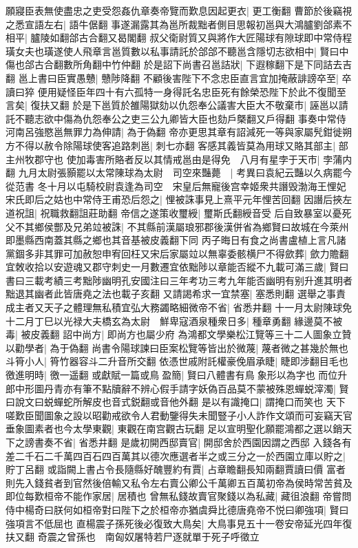 願寢臣表無使盡忠之吏受怨姦仇章奏帝覽而歎息因起更衣|{
	更工衡翻}
曹節於後竊視之悉宣語左右|{
	語牛倨翻}
事遂漏露其為邕所裁黜者側目思報初邕與大鴻臚劉郃素不相平|{
	臚陵如翻郃古合翻又曷閣翻}
叔父衛尉質又與將作大匠陽球有隙球即中常侍程璜女夫也璜遂使人飛章言邕質數以私事請託於郃郃不聽邕含隱切志欲相中|{
	賢曰中傷也郃古合翻數所角翻中竹仲翻}
於是詔下尚書召邕詰狀|{
	下遐稼翻下是下同詰去吉翻}
邕上書曰臣實愚戇|{
	戇陟降翻}
不顧後害陛下不念忠臣直言宜加掩蔽誹謗卒至|{
	卒讀曰猝}
便用疑怪臣年四十有六孤特一身得託名忠臣死有餘榮恐陛下於此不復聞至言矣|{
	復扶又翻}
於是下邕質於雒陽獄劾以仇怨奉公議害大臣大不敬棄市|{
	誣邕以請託不聽志欲中傷為仇怨奉公之吏三公九卿皆大臣也劾戶槩翻又戶得翻}
事奏中常侍河南呂強愍邕無罪力為伸請|{
	為于偽翻}
帝亦更思其章有詔減死一等與家屬髠鉗徙朔方不得以赦令除陽球使客追路刺邕|{
	刺七亦翻}
客感其義皆莫為用球又賂其部主|{
	部主州牧郡守也}
使加毒害所賂者反以其情戒邕由是得免　八月有星孛于天市|{
	孛蒲内翻}
九月太尉張顥罷以太常陳球為太尉　司空來豔薨　|{
	考異曰袁紀云豔以久病罷今從范書}
冬十月以屯騎校尉袁逢為司空　宋皇后無寵後宫幸姬衆共譖毁渤海王悝妃宋氏即后之姑也中常侍王甫恐后怨之|{
	悝被誅事見上熹平元年悝苦回翻}
因譖后挾左道祝詛|{
	祝職救翻詛莊助翻}
帝信之遂策收璽綬|{
	璽斯氏翻綬音受}
后自致暴室以憂死父不其鄉侯酆及兄弟竝被誅|{
	不其縣前漢屬琅邪郡後漢併省為鄉賢曰故城在今萊州即墨縣西南蓋其縣之鄉也其音基被皮義翻下同}
丙子晦日有食之尚書盧植上言凡諸黨錮多非其罪可加赦恕申宥回枉又宋后家屬竝以無辜委骸横尸不得歛葬|{
	歛力贍翻}
宜敇收拾以安遊魂又郡守刺史一月數遷宜依黜陟以章能否縱不九載可滿三歲|{
	賢曰書曰三載考績三考黜陟幽明孔安國注曰三年考功三考九年能否幽明有别升進其明者黜退其幽者此皆唐堯之法也載子亥翻}
又請謁希求一宜禁塞|{
	塞悉則翻}
選舉之事責成主者又天子之體理無私積宜弘大務蠲略細微帝不省|{
	省悉井翻}
十一月太尉陳球免　十二月丁巳以光禄大夫橋玄為太尉　鮮卑寇酒泉種衆日多|{
	種章勇翻}
緣邊莫不被毒|{
	被皮義翻}
詔中尚方|{
	即尚方也屬少府}
為鴻都文學樂松江覽等三十二人圖象立贊以勸學者|{
	為于偽翻}
尚書令陽球諫曰臣案松覽等皆出於微蔑|{
	蔑者微之甚幾於無也}
斗筲小人|{
	筲竹器容斗二升音所交翻}
依憑世戚附託權豪俛眉承睫|{
	睫即涉翻目毛也}
徼進明時|{
	徼一遥翻}
或獻賦一篇或鳥盈簡|{
	賢曰八體書有鳥象形以為字也}
而位升郎中形圖丹青亦有筆不點牘辭不辨心假手請字妖偽百品莫不蒙被殊恩蟬蜕滓濁|{
	賢曰說文曰蜕蟬蛇所解皮也音式鋭翻或音他外翻}
是以有識掩口|{
	謂掩口而笑也}
天下嗟歎臣聞圖象之設以昭勸戒欲令人君動鑒得失未聞豎子小人詐作文頌而可妄竊天官垂象圖素者也今太學東觀|{
	東觀在南宫觀古玩翻}
足以宣明聖化願罷鴻都之選以銷天下之謗書奏不省|{
	省悉井翻}
是歲初開西邸賣官|{
	開邸舍於西園因謂之西邸}
入錢各有差二千石二千萬四百石四百萬其以德次應選者半之或三分之一於西園立庫以貯之|{
	貯丁呂翻}
或詣闕上書占令長隨縣好醜豐約有賈|{
	占章瞻翻長知兩翻賈讀曰價}
富者則先入錢貧者到官然後倍輸又私令左右賣公卿公千萬卿五百萬初帝為侯時常苦貧及即位每歎桓帝不能作家居|{
	居積也}
曾無私錢故賣官聚錢以為私藏|{
	藏徂浪翻}
帝嘗問侍中楊奇曰朕何如桓帝對曰陛下之於桓帝亦猶虞舜比德唐堯帝不悦曰卿強項|{
	賢曰強項言不低屈也}
直楊震子孫死後必復致大鳥矣|{
	大鳥事見五十一卷安帝延光四年復扶又翻}
奇震之曾孫也　南匈奴屠特若尸逐就單于死子呼徵立

